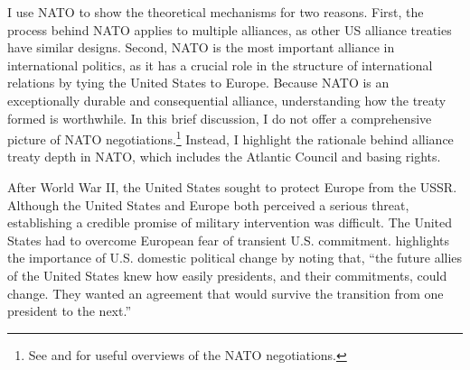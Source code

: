 \documentclass[12pt]{article}
\begin{document}
I use NATO to show the theoretical mechanisms for two reasons. 
First, the process behind NATO applies to multiple alliances, as other US alliance treaties have similar designs. 
Second, NATO is the most important alliance in international politics, as it has a crucial role in the structure of international relations by tying the United States to Europe. 
Because NATO is an exceptionally durable and consequential alliance, understanding how the treaty formed is worthwhile. 
In this brief discussion, I do not offer a comprehensive picture of NATO negotiations.\footnote{See \citet{Kaplan2007} and \citet{Poast2019a} for useful overviews of the NATO negotiations.} 
Instead, I highlight the rationale behind alliance treaty depth in NATO, which includes the Atlantic Council and basing rights. 


After World War II, the United States sought to protect Europe from the USSR. 
Although the United States and Europe both perceived a serious threat, establishing a credible promise of military intervention was difficult. 
The United States had to overcome European fear of transient U.S. commitment.
\citet[pg. 14]{Sayle2019} highlights the importance of U.S. domestic political change by noting that, ``the future allies of the United States knew how easily presidents, and their commitments, could change. They wanted an agreement that would survive the transition from one president to the next.'' 
\end{document}
